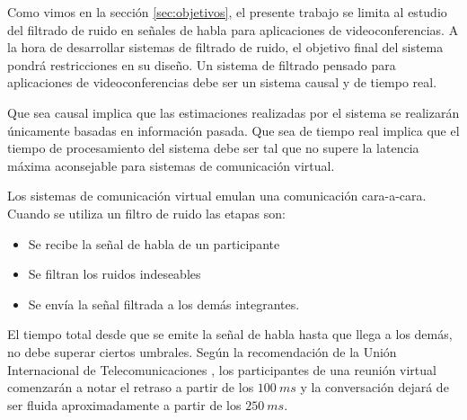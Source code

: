 Como vimos en la sección \ref{sec:objetivos}, el presente trabajo se limita al estudio del filtrado de ruido en señales de habla para aplicaciones de videoconferencias. A la hora de desarrollar sistemas de filtrado de ruido, el objetivo final del sistema pondrá restricciones en su diseño. Un sistema de filtrado pensado para aplicaciones de videoconferencias debe ser un sistema causal y de tiempo real.

Que sea causal implica que las estimaciones realizadas por el sistema se realizarán únicamente basadas en información pasada. Que sea de tiempo real implica que el tiempo de procesamiento del sistema debe ser tal que no supere la latencia máxima aconsejable para sistemas de comunicación virtual.

Los sistemas de comunicación virtual emulan una comunicación cara-a-cara. Cuando se utiliza un filtro de ruido las etapas son:

\begin{itemize}
	\item Se recibe la señal de habla de un participante
	\item Se filtran los ruidos indeseables
	\item Se envía la señal filtrada a los demás integrantes.
\end{itemize}

El tiempo total desde que se emite la señal de habla hasta que llega a los demás, no debe superar ciertos umbrales. Según la recomendación de la Unión Internacional de Telecomunicaciones \cite{itu_t_recommendation_g_114}, los participantes de una reunión virtual comenzarán a notar el retraso a partir de los $\SI{100}{ms}$ y la conversación dejará de ser fluida aproximadamente a partir de los $\SI{250}{ms}$.